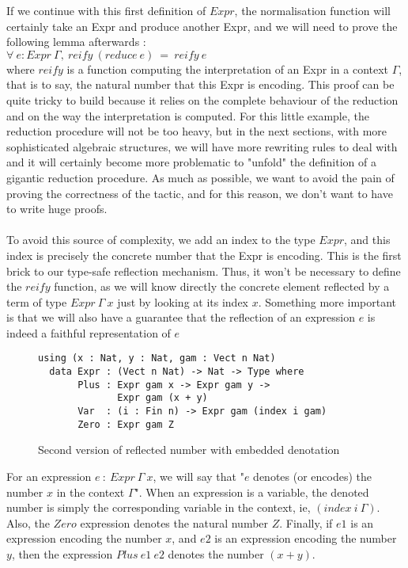 If we continue with this first definition of $Expr$, the normalisation function will certainly take an Expr and produce another Expr, and we will need to prove the following lemma afterwards : \\
$\forall\ e:Expr\ \Gamma,\ reify\ (reduce\ e)\ =\ reify\ e$ \\
where $reify$ is a function computing the interpretation of an Expr in a context $\Gamma$, that is to say, the natural number that this Expr is encoding.
This proof can be quite tricky to build because it relies on the complete behaviour of the reduction and on the way the interpretation is computed.
For this little example, the reduction procedure will not be too heavy, but in the next sections, with more sophisticated algebraic structures, we will have more rewriting rules to deal with and it will certainly become more problematic to "unfold" the definition of a gigantic reduction procedure. As much as possible, we want to avoid the pain of proving the correctness of the tactic, and for this reason, we don't want to have to write huge proofs. \\
\\
To avoid this source of complexity, we add an index to the type $Expr$, and this index is precisely the concrete number that the Expr is encoding. This is the first brick to our type-safe reflection mechanism. Thus, it won't be necessary to define the $reify$ function, as we will know directly the concrete element reflected by a term of type $Expr\ \Gamma\ x$ just by looking at its index $x$. Something more important is that we will also have a guarantee that the reflection of an expression $e$ is indeed a faithful representation of $e$ \\

\begin{figure}[H]
\figrule
\begin{center}
\begin{verbatim}
using (x : Nat, y : Nat, gam : Vect n Nat)
  data Expr : (Vect n Nat) -> Nat -> Type where
       Plus : Expr gam x -> Expr gam y -> 
              Expr gam (x + y)
       Var  : (i : Fin n) -> Expr gam (index i gam)
       Zero : Expr gam Z
\end{verbatim}
\end{center}
\caption{Second version of reflected number with embedded denotation}
\figrule
\end{figure}

For an expression $e\ :\ Expr\ \Gamma\ x$, we will say that "$e$ denotes (or encodes) the number $x$ in the context $\Gamma$".
When an expression is a variable, the denoted number is simply the corresponding variable in the context, ie, $(index\ i\ \Gamma)$.
Also, the $Zero$ expression denotes the natural number $Z$.
Finally, if $e1$ is an expression encoding the number $x$, and $e2$ is an expression encoding the number $y$, then the expression $Plus\ e1\ e2$ denotes the number $(x + y)$.


